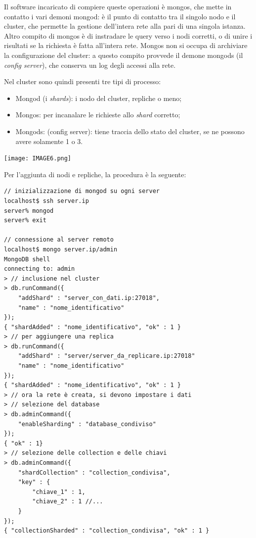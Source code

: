 \documentclass[a4page, 11pt]{article}
\begin{document}
Il software incaricato di compiere queste operazioni è mongos, che mette in contatto i vari demoni mongod: è il punto di contatto tra il singolo nodo e il cluster, che permette la gestione dell'intera rete alla pari di una singola istanza.
Altro compito di mongos è di instradare le query verso i nodi corretti, o di unire i risultati se la richiesta è fatta all'intera rete.
Mongos non si occupa di archiviare la configurazione del cluster: a questo compito provvede il demone mongods (il \textit{config server}), che conserva un log degli accessi alla rete.

Nel cluster sono quindi presenti tre tipi di processo:
\begin{itemize}
\item Mongod (i \textit{shards}): i nodo del cluster, repliche o meno;
\item Mongos: per incanalare le richieste allo \textit{shard} corretto;
\item Mongods: (config server): tiene traccia dello stato del cluster, se ne possono avere solamente 1 o 3.
\end{itemize}

\begin{center}
  \texttt{[image: IMAGE6.png]}
\end{center}

Per l'aggiunta di nodi e repliche, la procedura è la seguente:
\begin{verbatim}
// inizializzazione di mongod su ogni server
localhost$ ssh server.ip
server% mongod
server% exit

// connessione al server remoto
localhost$ mongo server.ip/admin
MongoDB shell
connecting to: admin
> // inclusione nel cluster
> db.runCommand({
    "addShard" : "server_con_dati.ip:27018",
    "name" : "nome_identificativo"
});
{ "shardAdded" : "nome_identificativo", "ok" : 1 }
> // per aggiungere una replica
> db.runCommand({
    "addShard" : "server/server_da_replicare.ip:27018"
    "name" : "nome_identificativo"
});
{ "shardAdded" : "nome_identificativo", "ok" : 1 }
> // ora la rete è creata, si devono impostare i dati
> // selezione del database
> db.adminCommand({
    "enableSharding" : "database_condiviso"
});
{ "ok" : 1}
> // selezione delle collection e delle chiavi
> db.adminCommand({
    "shardCollection" : "collection_condivisa",
    "key" : {
        "chiave_1" : 1,
        "chiave_2" : 1 //...
    }
});
{ "collectionSharded" : "collection_condivisa", "ok" : 1 }
\end{verbatim}
\end{document}
